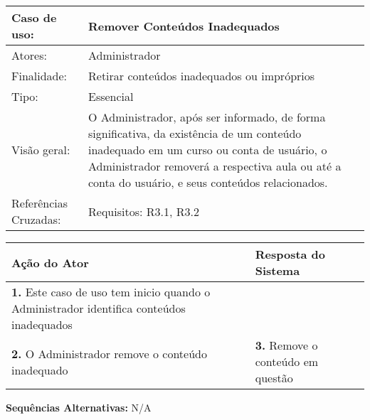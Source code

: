 \documentclass[12pt,a4paper,onecolumn,titlepage]{article}
\begin{document}
\begin{table}[h!]
\begin{center}
\begin{tabular}{p{2.5cm} p{9.5cm}}
Caso de uso: & \textbf{Remover Conteúdos Inadequados} \\ \hline
Atores: & Administrador \\ \hline
Finalidade: & Retirar conteúdos inadequados ou impróprios\\ \hline
Tipo: & Essencial \\ \hline
Visão geral: & O Administrador, após ser informado, de forma significativa, da existência de um conteúdo inadequado em um curso ou conta de usuário, o Administrador removerá a respectiva aula ou até a conta do usuário, e seus conteúdos relacionados. \\ \hline
Referências Cruzadas: & Requisitos: R3.1, R3.2\\ 

\end{tabular}
\end{center}
\end{table}

\begin{center}
\def\arraystretch{1.1}
\begin{tabular}{|p{6cm}|p{6cm}|}

\hline
\textbf{Ação do Ator} & \textbf{Resposta do Sistema} \\ \hline
\textbf{1.} Este caso de uso tem inicio quando o Administrador identifica conteúdos inadequados  & \\ \hline
\textbf{2.} O Administrador remove o conteúdo inadequado  & \textbf{3.} Remove o conteúdo em questão  \\ \hline
\end{tabular}
\end{center}

\textbf{Sequências Alternativas:} N/A

\newpage
\end{document}

